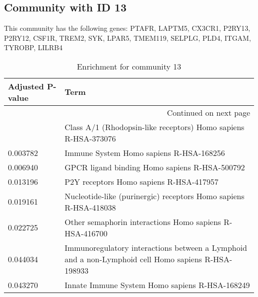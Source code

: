 \subsection*{Community with ID 13}
This community has the following genes: PTAFR, LAPTM5, CX3CR1, P2RY13, P2RY12, CSF1R, TREM2, SYK, LPAR5, TMEM119, SELPLG, PLD4, ITGAM, TYROBP, LILRB4
\\
\begin{longtable}{p{2.4cm}p{14.5cm}}
\caption{Enrichment for community 13}\\
\toprule
Adjusted \newline P-value &                                                                                                Term \\
\midrule
\endhead
\midrule
\multicolumn{2}{r}{{Continued on next page}} \\
\midrule
\endfoot

\bottomrule
\endlastfoot
                 0.004285 &                                      Class A/1 (Rhodopsin-like receptors) Homo sapiens R-HSA-373076 \\
                 0.003782 &                                                             Immune System Homo sapiens R-HSA-168256 \\
                 0.006940 &                                                       GPCR ligand binding Homo sapiens R-HSA-500792 \\
                 0.013196 &                                                             P2Y receptors Homo sapiens R-HSA-417957 \\
                 0.019161 &                                    Nucleotide-like (purinergic) receptors Homo sapiens R-HSA-418038 \\
                 0.022725 &                                             Other semaphorin interactions Homo sapiens R-HSA-416700 \\
                 0.044034 &  Immunoregulatory interactions between a Lymphoid and a non-Lymphoid cell Homo sapiens R-HSA-198933 \\
                 0.043270 &                                                      Innate Immune System Homo sapiens R-HSA-168249 \\
\end{longtable}


